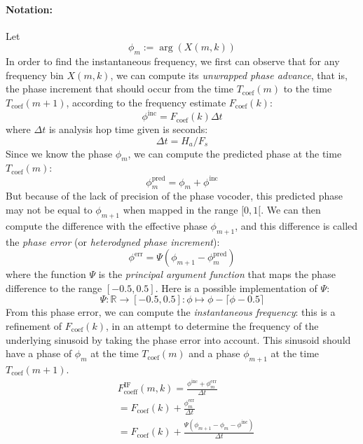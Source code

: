 \documentclass[letterpaper]{article}
\begin{document}
\paragraph{Notation:}
Let \[\phi_m:=\arg(X(m,k))\]
In order to find the instantaneous frequency, we first can observe that for
any frequency bin \(X(m,k)\), we can compute its \emph{unwrapped phase advance},
that is, the phase increment that should occur from the time
\(T_{\text{coef}}(m)\) to the time \(T_{\text{coef}}(m+1)\), according to the
frequency estimate \(F_{\text{coef}}(k)\):
\begin{equation}
    \phi^{\text{inc}}=F_{\text{coef}}(k) \Delta t
\end{equation}
where \(\Delta t\) is analysis hop time given is seconds:
\begin{equation}
    \Delta t=H_a/F_s
\end{equation}
Since we know the phase \(\phi_m\), we can compute the predicted phase at
the time \(T_{\text{coef}}(m)\):
\begin{equation}
    \phi^{\text{pred}}_m=\phi_m + \phi^{\text{inc}}
\end{equation}
But because of the lack of precision of the phase vocoder, this predicted phase
may not be equal to \(\phi_{m+1}\) when mapped in the range \([0, 1[\).
We can then compute the difference with the effective phase \(\phi_{m+1}\), and
this difference is called the \emph{phase error} (or \emph{heterodyned phase
increment}):
\begin{equation}
    \phi^{\text{err}}=\Psi(\phi_{m+1} - \phi^{\text{pred}}_m)
\end{equation}
where the function \(\Psi\) is the \emph{principal argument function} that maps
the phase difference to the range \([-0.5, 0.5]\).
Here is a possible implementation of \(\Psi\):
\begin{equation}
    \Psi:\mathbb{R}\to[-0.5,0.5]:\phi\mapsto \phi - \lceil \phi-0.5 \rceil
\end{equation}
From this phase error, we can compute the \emph{instantaneous frequency}: this
is a refinement of \(F_{\text{coef}}(k)\), in an attempt to determine the
frequency of the underlying sinusoid by taking the phase error into account.
This sinusoid should have a phase of
\(\phi_m\) at the time \(T_{\text{coef}}(m)\) and a phase \(\phi_{m+1}\) at
the time \(T_{\text{coef}}(m+1)\).
\begin{align}
    &F_{\text{coeff}}^{\text{IF}}(m,k)=\frac{\phi^{\text{inc}} + \phi^{\text{err}}_m}{\Delta t}\\
    &=F_{\text{coef}}(k) + \frac{\phi^{\text{err}}_m}{\Delta t}\\
    &=F_{\text{coef}}(k) + \frac{\Psi(\phi_{m+1} - \phi_m - \phi^{\text{inc}})}{\Delta t}
\end{align}
\end{document}
